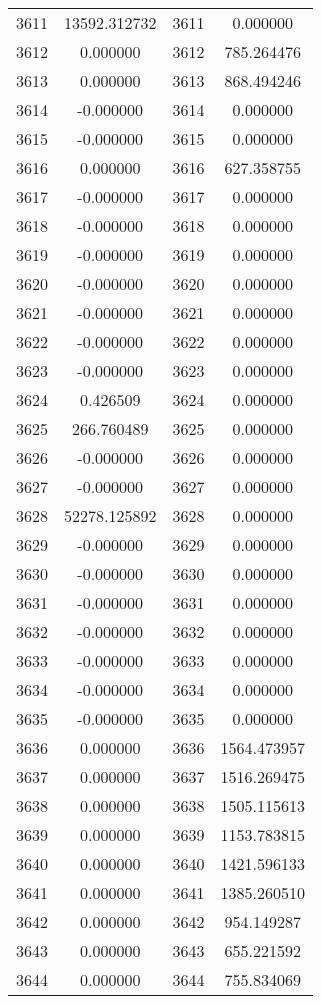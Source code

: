 \documentclass[12pt]{article}
\begin{document}
\begin{longtable}{@{}cccc@{}}
3611 & 13592.312732 & 3611 & 0.000000 \\
3612 & 0.000000 & 3612 & 785.264476 \\
3613 & 0.000000 & 3613 & 868.494246 \\
3614 & -0.000000 & 3614 & 0.000000 \\
3615 & -0.000000 & 3615 & 0.000000 \\
3616 & 0.000000 & 3616 & 627.358755 \\
3617 & -0.000000 & 3617 & 0.000000 \\
3618 & -0.000000 & 3618 & 0.000000 \\
3619 & -0.000000 & 3619 & 0.000000 \\
3620 & -0.000000 & 3620 & 0.000000 \\
3621 & -0.000000 & 3621 & 0.000000 \\
3622 & -0.000000 & 3622 & 0.000000 \\
3623 & -0.000000 & 3623 & 0.000000 \\
3624 & 0.426509 & 3624 & 0.000000 \\
3625 & 266.760489 & 3625 & 0.000000 \\
3626 & -0.000000 & 3626 & 0.000000 \\
3627 & -0.000000 & 3627 & 0.000000 \\
3628 & 52278.125892 & 3628 & 0.000000 \\
3629 & -0.000000 & 3629 & 0.000000 \\
3630 & -0.000000 & 3630 & 0.000000 \\
3631 & -0.000000 & 3631 & 0.000000 \\
3632 & -0.000000 & 3632 & 0.000000 \\
3633 & -0.000000 & 3633 & 0.000000 \\
3634 & -0.000000 & 3634 & 0.000000 \\
3635 & -0.000000 & 3635 & 0.000000 \\
3636 & 0.000000 & 3636 & 1564.473957 \\
3637 & 0.000000 & 3637 & 1516.269475 \\
3638 & 0.000000 & 3638 & 1505.115613 \\
3639 & 0.000000 & 3639 & 1153.783815 \\
3640 & 0.000000 & 3640 & 1421.596133 \\
3641 & 0.000000 & 3641 & 1385.260510 \\
3642 & 0.000000 & 3642 & 954.149287 \\
3643 & 0.000000 & 3643 & 655.221592 \\
3644 & 0.000000 & 3644 & 755.834069 \\

\end{longtable}
\end{document}
